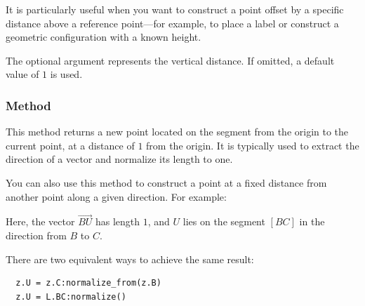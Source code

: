 \medskip

It is particularly useful when you want to construct a point offset by a specific distance above a reference point—for example, to place a label or construct a geometric configuration with a known height.

\medskip

The optional argument  represents the vertical distance. If omitted, a default value of $1$ is used.

\vspace{1em}


\begin{tkzexample}[latex = 7cm]
\begin{center}
\end{center}
\end{tkzexample}

\subsubsection{Method }
\label{ssub:method_normalize}

This method returns a new point located on the segment from the origin to the current point, at a distance of $1$ from the origin. It is typically used to extract the direction of a vector and normalize its length to one.

\medskip

You can also use this method to construct a point at a fixed distance from another point along a given direction. For example:

\begin{center}
\end{center}


Here, the vector $\overrightarrow{BU}$ has length $1$, and $U$ lies on the segment $[BC]$ in the direction from $B$ to $C$.

\medskip

There are two equivalent ways to achieve the same result:

\begin{mybox}
\begin{verbatim}
  z.U = z.C:normalize_from(z.B)
  z.U = L.BC:normalize()
\end{verbatim}
\end{mybox}


